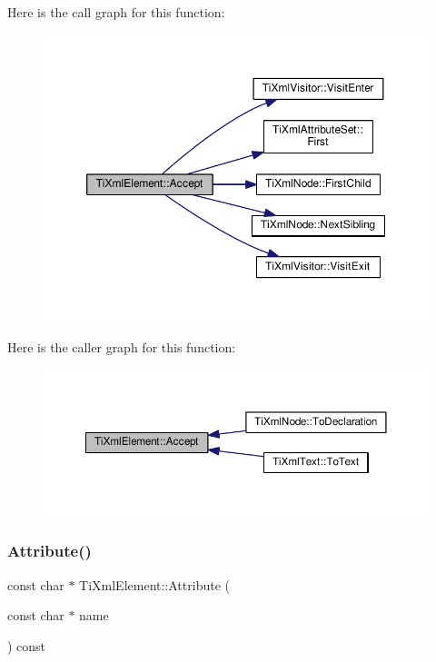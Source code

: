Here is the call graph for this function\+:\nopagebreak
\begin{figure}[H]
\begin{center}
\leavevmode
\includegraphics[width=350pt]{class_ti_xml_element_a01d33358cce9d1817b557d314dda3779_cgraph}
\end{center}
\end{figure}
Here is the caller graph for this function\+:\nopagebreak
\begin{figure}[H]
\begin{center}
\leavevmode
\includegraphics[width=350pt]{class_ti_xml_element_a01d33358cce9d1817b557d314dda3779_icgraph}
\end{center}
\end{figure}
\mbox{\label{class_ti_xml_element_a6042f518748f475a7ac4b4e0b509eb05}} 
\subsubsection{\texorpdfstring{Attribute()}{Attribute()}\hspace{0.1cm}{\footnotesize\ttfamily [1/3]}}
{\footnotesize\ttfamily const char $\ast$ Ti\+Xml\+Element\+::\+Attribute (\begin{DoxyParamCaption}\item[{const char $\ast$}]{name }\end{DoxyParamCaption}) const}

